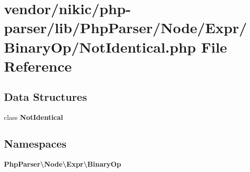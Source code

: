 \section{vendor/nikic/php-\/parser/lib/\+Php\+Parser/\+Node/\+Expr/\+Binary\+Op/\+Not\+Identical.php File Reference}
\label{_not_identical_8php}
\subsection*{Data Structures}
\begin{DoxyCompactItemize}
\item 
class {\bf Not\+Identical}
\end{DoxyCompactItemize}
\subsection*{Namespaces}
\begin{DoxyCompactItemize}
\item 
 {\bf Php\+Parser\textbackslash{}\+Node\textbackslash{}\+Expr\textbackslash{}\+Binary\+Op}
\end{DoxyCompactItemize}
